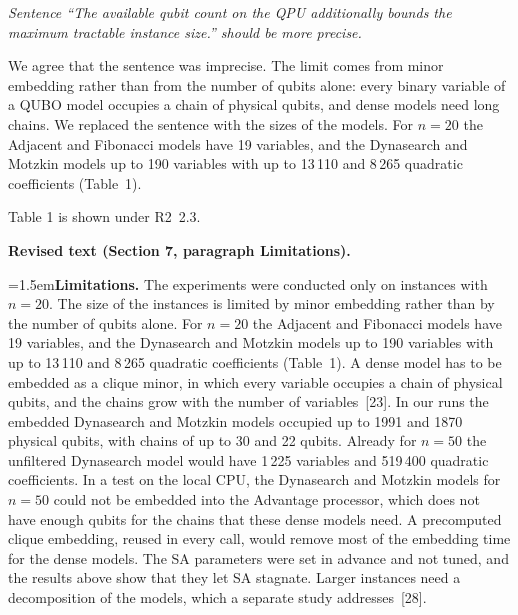 \documentclass[12pt]{article}
\newenvironment{rc}[1]{\par\medskip\noindent\itshape\renewcommand{\emph}[1]{\textbf{##1}}\ignorespaces}{\par}
\newcommand{\answer}[1]{\par\smallskip\noindent #1\par}
\newcommand{\change}[3]{\par\smallskip\noindent\textbf{Revised text (#1).}\par
  {\leftskip=1.5em\noindent#3\par}}
\begin{document}
\begin{rc}{R1.3 --- Qubit count and instance size}
Sentence ``The available qubit count on the QPU additionally bounds the maximum tractable instance size.'' should be more precise.
\end{rc}
\answer{We agree that the sentence was imprecise. The limit comes from minor embedding rather than from the number of qubits alone: every binary variable of a QUBO model occupies a chain of physical qubits, and dense models need long chains. We replaced the sentence with the sizes of the models. For $n=20$ the Adjacent and Fibonacci models have 19 variables, and the Dynasearch and Motzkin models up to 190 variables with up to 13\,110 and 8\,265 quadratic coefficients (Table~1).}
Table 1 is shown under R2~2.3.
\change{Section 7, paragraph Limitations}{The available qubit count on the QPU additionally bounds the maximum tractable instance size.}{\textbf{Limitations.} The experiments were conducted only on instances with $n=20$. The size of the instances is limited by minor embedding rather than by the number of qubits alone. For $n=20$ the Adjacent and Fibonacci models have 19 variables, and the Dynasearch and Motzkin models up to 190 variables with up to 13\,110 and 8\,265 quadratic coefficients (Table~1). A dense model has to be embedded as a clique minor, in which every variable occupies a chain of physical qubits, and the chains grow with the number of variables~[23]. In our runs the embedded Dynasearch and Motzkin models occupied up to 1991 and 1870 physical qubits, with chains of up to 30 and 22 qubits. Already for $n=50$ the unfiltered Dynasearch model would have 1\,225 variables and 519\,400 quadratic coefficients. In a test on the local CPU, the Dynasearch and Motzkin models for $n=50$ could not be embedded into the Advantage processor, which does not have enough qubits for the chains that these dense models need. A precomputed clique embedding, reused in every call, would remove most of the embedding time for the dense models. The SA parameters were set in advance and not tuned, and the results above show that they let SA stagnate. Larger instances need a decomposition of the models, which a separate study addresses~[28].}
\end{document}
